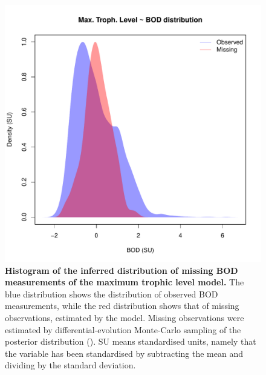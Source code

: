 \documentclass[11pt, oneside]{article}
\begin{document}
\begin{figure}[H]
\begin{center}
\includegraphics[page=1, width=1\linewidth]{b0_6_2/out_mTL/fig_hist_missing_bod.pdf}
\caption{
    \textbf{Histogram of the inferred distribution of missing BOD measurements of the maximum trophic level model.}
    The blue distribution shows the distribution of observed BOD measurements, while the red distribution shows that of missing observations, estimated by the model.
    Missing observations were estimated by differential-evolution Monte-Carlo sampling of the posterior distribution (\cite{TerBraak2006}).
    SU means standardised units, namely that the variable has been standardised by subtracting the mean and dividing by the standard deviation.
} 
\end{center}
\end{figure}
\end{document}
